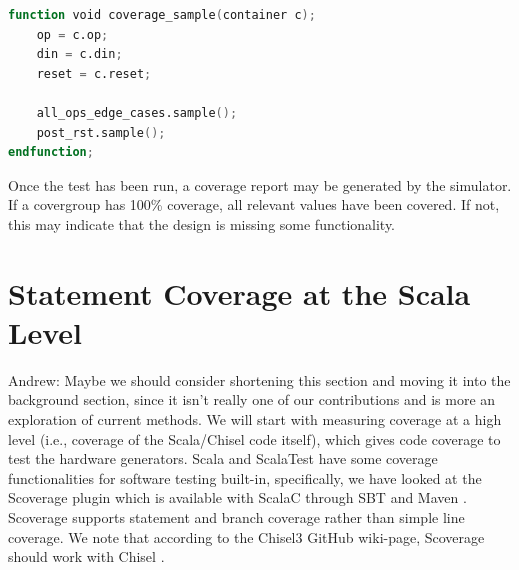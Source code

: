 \documentclass[runningheads]{llncs}
\newcommand{\martin}[1]{{\color{blue} Martin: #1}}
\newcommand{\andrew}[1]{{\color{red} Andrew: #1}}
\renewcommand{\martin}[1]{}
\begin{document}
\begin{lstlisting}[language=verilog]
function void coverage_sample(container c);
	op = c.op;
	din = c.din;
	reset = c.reset;
	
	all_ops_edge_cases.sample();
	post_rst.sample();
endfunction;
\end{lstlisting}

Once the test has been run, a coverage report may be generated by the simulator. If a covergroup has 100\% coverage, all relevant values have been covered. If not, this may indicate that the design is missing some functionality.



\section{Statement Coverage at the Scala Level}
\andrew{Maybe we should consider shortening this section and moving it into the background section, since it isn't really one of our contributions and is more an exploration of current methods.}
We will start with measuring coverage at a high level (i.e., coverage of the Scala/Chisel code itself), which gives code coverage to test the hardware generators. Scala and ScalaTest have some coverage functionalities for software testing built-in, specifically, we have looked at the Scoverage plugin which is available with ScalaC through SBT and Maven \cite{scoverage}. Scoverage supports statement and branch coverage rather than simple line coverage. We note that according to the Chisel3 GitHub wiki-page, Scoverage should work with Chisel \cite{chisel:scoverage}.

\end{document}
